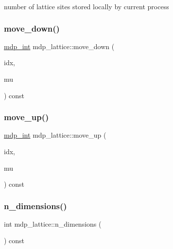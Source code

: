 number of lattice sites stored locally by current process 

\mbox{\label{classmdp__lattice_a7e1ef9c265d9452088a9024fe44ddb5d}} 
\subsubsection{\texorpdfstring{move\+\_\+down()}{move\_down()}}
{\footnotesize\ttfamily \hyperlink{mdp__global__vars_8h_aaa1ad9d0dcd2124aa5af0120d9954174}{mdp\+\_\+int} mdp\+\_\+lattice\+::move\+\_\+down (\begin{DoxyParamCaption}\item[{const \hyperlink{mdp__global__vars_8h_aaa1ad9d0dcd2124aa5af0120d9954174}{mdp\+\_\+int}}]{idx,  }\item[{const int}]{mu }\end{DoxyParamCaption}) const\hspace{0.3cm}{\ttfamily [inline]}}

\mbox{\label{classmdp__lattice_a24238ce792de8d69096d6656da727b3f}} 
\subsubsection{\texorpdfstring{move\+\_\+up()}{move\_up()}}
{\footnotesize\ttfamily \hyperlink{mdp__global__vars_8h_aaa1ad9d0dcd2124aa5af0120d9954174}{mdp\+\_\+int} mdp\+\_\+lattice\+::move\+\_\+up (\begin{DoxyParamCaption}\item[{const \hyperlink{mdp__global__vars_8h_aaa1ad9d0dcd2124aa5af0120d9954174}{mdp\+\_\+int}}]{idx,  }\item[{const int}]{mu }\end{DoxyParamCaption}) const\hspace{0.3cm}{\ttfamily [inline]}}

\mbox{\label{classmdp__lattice_a347e54e6c3dde2f2d7d5bef76ec0b1f5}} 
\subsubsection{\texorpdfstring{n\+\_\+dimensions()}{n\_dimensions()}}
{\footnotesize\ttfamily int mdp\+\_\+lattice\+::n\+\_\+dimensions (\begin{DoxyParamCaption}{ }\end{DoxyParamCaption}) const\hspace{0.3cm}{\ttfamily [inline]}}



